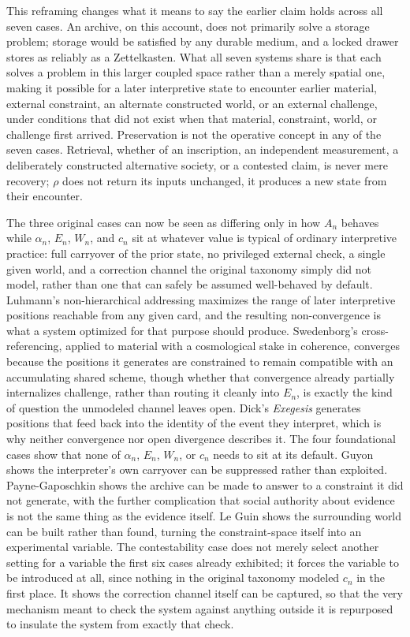 \documentclass[11pt]{article}
\begin{document}
This reframing changes what it means to say the earlier claim holds across all seven cases. An archive, on this account, does not primarily solve a storage problem; storage would be satisfied by any durable medium, and a locked drawer stores as reliably as a Zettelkasten. What all seven systems share is that each solves a problem in this larger coupled space rather than a merely spatial one, making it possible for a later interpretive state to encounter earlier material, external constraint, an alternate constructed world, or an external challenge, under conditions that did not exist when that material, constraint, world, or challenge first arrived. Preservation is not the operative concept in any of the seven cases. Retrieval, whether of an inscription, an independent measurement, a deliberately constructed alternative society, or a contested claim, is never mere recovery; $\rho$ does not return its inputs unchanged, it produces a new state from their encounter.

The three original cases can now be seen as differing only in how $A_n$ behaves while $\alpha_n$, $E_n$, $W_n$, and $c_n$ sit at whatever value is typical of ordinary interpretive practice: full carryover of the prior state, no privileged external check, a single given world, and a correction channel the original taxonomy simply did not model, rather than one that can safely be assumed well-behaved by default. Luhmann's non-hierarchical addressing maximizes the range of later interpretive positions reachable from any given card, and the resulting non-convergence is what a system optimized for that purpose should produce. Swedenborg's cross-referencing, applied to material with a cosmological stake in coherence, converges because the positions it generates are constrained to remain compatible with an accumulating shared scheme, though whether that convergence already partially internalizes challenge, rather than routing it cleanly into $E_n$, is exactly the kind of question the unmodeled channel leaves open. Dick's \emph{Exegesis} generates positions that feed back into the identity of the event they interpret, which is why neither convergence nor open divergence describes it. The four foundational cases show that none of $\alpha_n$, $E_n$, $W_n$, or $c_n$ needs to sit at its default. Guyon shows the interpreter's own carryover can be suppressed rather than exploited. Payne-Gaposchkin shows the archive can be made to answer to a constraint it did not generate, with the further complication that social authority about evidence is not the same thing as the evidence itself. Le Guin shows the surrounding world can be built rather than found, turning the constraint-space itself into an experimental variable. The contestability case does not merely select another setting for a variable the first six cases already exhibited; it forces the variable to be introduced at all, since nothing in the original taxonomy modeled $c_n$ in the first place. It shows the correction channel itself can be captured, so that the very mechanism meant to check the system against anything outside it is repurposed to insulate the system from exactly that check.
\end{document}
